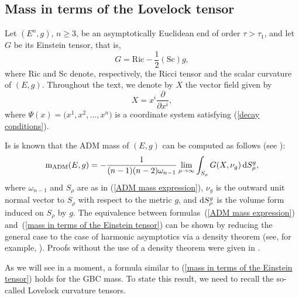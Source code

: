 \documentclass[pdftex]{sigma}
\numberwithin{equation}{section}
\begin{document}
\subsection{Mass in terms of the Lovelock tensor}

Let $(E^n,g)$, $n \geq 3$, be an asymptotically Euclidean end of order $\tau > \tau_1$, and let $G$ be its Einstein tensor, that is,
\begin{equation*}
  G = \mathrm{Ric} - \frac{1}{2}(\mathrm{Sc})g,
\end{equation*}
where $\mathrm{Ric}$ and $\mathrm{Sc}$ denote, respectively, the Ricci tensor and the scalar curvature of $(E,g)$. Throughout the text, we denote by $X$ the vector field given by{\samepage
\begin{equation} \label{X}
 X = x^i \frac{\partial}{\partial x^i},
\end{equation}
where $\Psi(x) = \bigl( x^1, x^2, \ldots, x^n \bigr)$ is a coordinate system satisfying (\ref{decay conditions}).}

Is is known that the ADM mass of $(E,g)$ can be computed as follows (see \cite{Ashtekar-Hansen,Chrusciel86,Chrusciel87}):
\begin{equation} \label{mass in terms of the Einstein tensor}
 \mathrm{m}_{\mathrm{ADM}}(E,g) = -\frac{1}{(n-1)(n-2)\omega_{n-1}} \lim_{\rho \to \infty} \int_{S_\rho} G(X,\nu_g) \, {\rm d}S_\rho^g,
\end{equation}
where $\omega_{n-1}$ and $S_\rho$ are as in (\ref{ADM mass expression}), $\nu_g$ is the outward unit normal vector to $S_\rho$ with respect to the metric $g$, and ${\rm d}S_\rho^g$ is the volume form induced on $S_\rho$ by $g$. The equivalence between formulas~(\ref{ADM mass expression}) and~(\ref{mass in terms of the Einstein tensor}) can be shown by reducing the general case to the case of harmonic asymptotics via a density theorem (see, for example, \cite{Huang12}). Proofs without the use of a density theorem were given in \cite{HerzlichComputingasymptoticinvariants2016,Miao-Tam}.

As we will see in a moment, a formula similar to (\ref{mass in terms of the Einstein tensor}) holds for the GBC mass. To state this result, we need to recall the so-called Lovelock curvature tensors.
\end{document}
